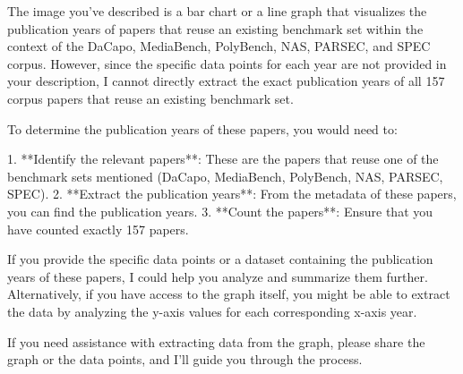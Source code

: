 The image you've described is a bar chart or a line graph that visualizes the publication years of papers that reuse an existing benchmark set within the context of the DaCapo, MediaBench, PolyBench, NAS, PARSEC, and SPEC corpus. However, since the specific data points for each year are not provided in your description, I cannot directly extract the exact publication years of all 157 corpus papers that reuse an existing benchmark set.

To determine the publication years of these papers, you would need to:

1. **Identify the relevant papers**: These are the papers that reuse one of the benchmark sets mentioned (DaCapo, MediaBench, PolyBench, NAS, PARSEC, SPEC).
2. **Extract the publication years**: From the metadata of these papers, you can find the publication years.
3. **Count the papers**: Ensure that you have counted exactly 157 papers.

If you provide the specific data points or a dataset containing the publication years of these papers, I could help you analyze and summarize them further. Alternatively, if you have access to the graph itself, you might be able to extract the data by analyzing the y-axis values for each corresponding x-axis year.

If you need assistance with extracting data from the graph, please share the graph or the data points, and I'll guide you through the process.